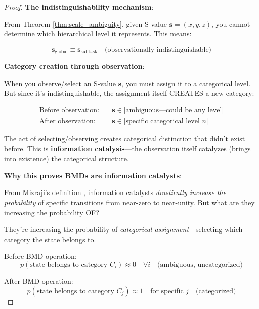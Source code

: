 \documentclass[12pt,a4paper]{article}
\begin{document}
\begin{proof}
\textbf{The indistinguishability mechanism}:

From Theorem \ref{thm:scale_ambiguity}, given S-value $\mathbf{s} = (x, y, z)$, you cannot determine which hierarchical level it represents. This means:

\begin{equation}
\mathbf{s}_{\text{global}} \equiv \mathbf{s}_{\text{subtask}} \quad \text{(observationally indistinguishable)}
\end{equation}

\textbf{Category creation through observation}:

When you observe/select an S-value $\mathbf{s}$, you must assign it to a categorical level. But since it's indistinguishable, the assignment itself CREATES a new category:

\begin{align}
\text{Before observation:} \quad &\mathbf{s} \in \text{[ambiguous—could be any level]} \\
\text{After observation:} \quad &\mathbf{s} \in \text{[specific categorical level } n\text{]}
\end{align}

The act of selecting/observing creates categorical distinction that didn't exist before. This is \textbf{information catalysis}—the observation itself catalyzes (brings into existence) the categorical structure.

\textbf{Why this proves BMDs are information catalysts}:

From Mizraji's definition \cite{mizraji2021biological}, information catalysts \textit{drastically increase the probability} of specific transitions from near-zero to near-unity. But what are they increasing the probability OF?

They're increasing the probability of \textit{categorical assignment}—selecting which category the state belongs to.

Before BMD operation:
\begin{equation}
p(\text{state belongs to category } C_i) \approx 0 \quad \forall i \quad \text{(ambiguous, uncategorized)}
\end{equation}

After BMD operation:
\begin{equation}
p(\text{state belongs to category } C_j) \approx 1 \quad \text{for specific } j \quad \text{(categorized)}
\end{equation}


\end{proof}
\end{document}
